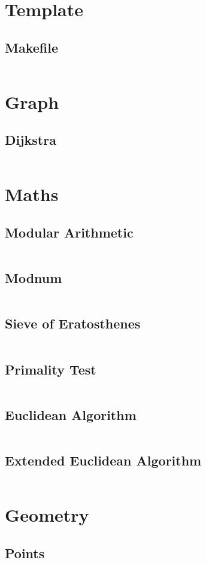 \section{Template}
  \subsection{Makefile}
    \inputminted{basemake}{library/template/Makefile}

\section{Graph}
  \subsection{Dijkstra}
    \inputminted{cpp}{library/graphs/dijkstra.cpp}

\section{Maths}
  \subsection{Modular Arithmetic}
    \inputminted{cpp}{library/maths/mod.hpp}
  \subsection{Modnum}
    \inputminted{cpp}{library/maths/modnum.hpp}
    \subsection{Sieve of Eratosthenes}
    \inputminted{cpp}{library/maths/sieve.cpp}
    \subsection{Primality Test}
      \inputminted{cpp}{library/maths/primality.hpp}
  \subsection{Euclidean Algorithm}
    \inputminted{cpp}{library/maths/euclidean.hpp}
  \subsection{Extended Euclidean Algorithm}
    \inputminted{cpp}{library/maths/extended_euclidean.hpp}

\section{Geometry}
  \subsection{Points}
    \inputminted{cpp}{library/geo/point.hpp}